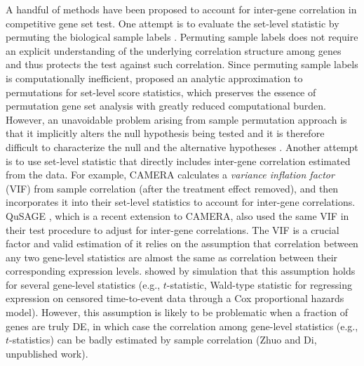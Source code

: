 \documentclass[a4,center,fleqn]{NAR}
\newcommand{\thepapertobefinished}{Zhuo and Di, unpublished work}
\begin{document}
	A handful of methods have been proposed to account for inter-gene correlation in competitive gene
	set test. One attempt is to evaluate the set-level statistic by permuting the biological sample
	labels \citep{subramanian2005gene, efron2007testing}. Permuting sample labels
	does not require an explicit understanding of the underlying correlation structure among genes and
	thus protects the test against such correlation. Since permuting sample labels is computationally
	inefficient, \citet{zhou2013empirical} proposed an analytic approximation to permutations for
	set-level score statistics, which preserves the essence of permutation gene set analysis with
	greatly reduced computational burden. However, an unavoidable problem arising from sample
	permutation approach is that it implicitly alters the null hypothesis being tested and it is
	therefore difficult to characterize the null and the alternative hypotheses
	\citep{goeman2007analyzing, khatri2012ten, wu2012camera}. Another attempt is to use set-level
	statistic that directly includes inter-gene correlation estimated from the data. For example, CAMERA
	\citep{wu2012camera} calculates a \textit{variance inflation factor} (VIF) from sample correlation
	(after the treatment effect removed), and then incorporates it into their set-level statistics to
	account for inter-gene correlations. QuSAGE \citep{yaari2013quantitative}, which is a recent
	extension to CAMERA, also used the same VIF in their test procedure to adjust for 
	inter-gene correlations. The VIF is a crucial factor and valid estimation of it
	relies on the assumption that correlation between any two gene-level statistics are almost the same as
	correlation between their corresponding expression levels. \citet{barry2008statistical} showed by simulation
	that this assumption holds for several gene-level statistics
	(e.g., $t$-statistic, Wald-type statistic for regressing expression on censored time-to-event data
	through a Cox proportional hazards model). However, this assumption is likely to be problematic when a fraction of genes are 
	truly DE, in which case the correlation among gene-level
	statistics (e.g., $t$-statistics) can be badly estimated by sample correlation 
	(\thepapertobefinished). 
	
	
	
\end{document}
